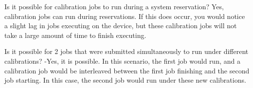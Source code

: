 Is it possible for calibration jobs to run during a system reservation?
Yes, calibration jobs can run during reservations. If this does occur, you would notice a slight lag in jobs executing on the device, but these calibration jobs will not take a large amount of time to finish executing.

Is it possible for 2 jobs that were submitted simultaneously to run under different calibrations?
-Yes, it is possible. In this scenario, the first job would run, and a calibration job would be interleaved between the first job finishing and the second job starting. In this case, the second job would run under these new calibrations.

